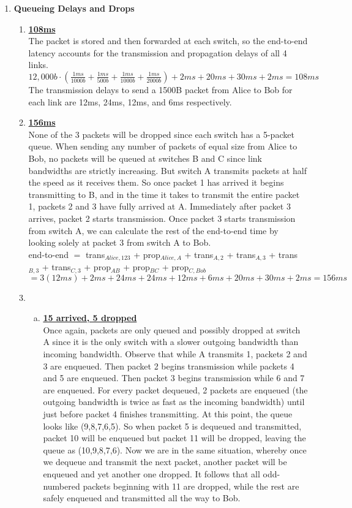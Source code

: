 \documentclass[11pt,fleqn]{article}
\begin{document}
\begin{enumerate}[1)]
\newpage
\item  \textbf{Queueing Delays and Drops}
\begin{enumerate}[1.]
\item {\bf\underline{108ms}} \\ The packet is stored and then forwarded at each switch, so the end-to-end latency accounts for the transmission and propagation delays of all 4 links. \\
$\displaystyle 12,000b \cdot (\frac{1ms}{1000b} + \frac{1ms}{500b} + \frac{1ms}{1000b} + \frac{1ms}{2000b}) + 2ms + 20ms + 30ms + 2ms = 108ms$ \\ The transmission delays to send a 1500B packet from Alice to Bob for each link are 12ms, 24ms, 12ms, and 6ms respectively.
\item {\bf\underline{156ms}} \\ None of the 3 packets will be dropped since each switch has a 5-packet queue. When sending any number of packets of equal size from Alice to Bob, no packets will be queued at switches B and C since link bandwidths are strictly increasing. But switch A transmits packets at half the speed as it receives them. So once packet 1 has arrived it begins transmitting to B, and in the time it takes to transmit the entire packet 1, packets 2 and 3 have fully arrived at A. Immediately after packet 3 arrives, packet 2 starts transmission. Once packet 3 starts transmission from switch A, we can calculate the rest of the end-to-end time by looking solely at packet 3 from switch A to Bob. \\
end-to-end $=$ trans$_{Alice,123}$ + prop$_{Alice,A}$ + trans$_{A,2}$ + trans$_{A,3}$ + trans$_{B,3}$ + trans$_{C,3}$ + prop$_{AB}$ + prop$_{BC}$ + prop$_{C,Bob}$ \\
\qquad $= 3(12ms) + 2ms + 24ms + 24ms + 12ms + 6ms + 20ms + 30ms + 2ms = 156ms$
\item
\begin{enumerate}[(a)]
\item {\bf\underline{15 arrived, 5 dropped}} \\ Once again, packets are only queued and possibly dropped at switch A since it is the only switch with a slower outgoing bandwidth than incoming bandwidth. Observe that while A transmits 1, packets 2 and 3 are enqueued. Then packet 2 begins transmission while packets 4 and 5 are enqueued. Then packet 3 begins transmission while 6 and 7 are enqueued. For every packet dequeued, 2 packets are enqueued (the outgoing bandwidth is twice as fast as the incoming bandwidth) until just before packet 4 finishes transmitting. At this point, the queue looks like (9,8,7,6,5). So when packet 5 is dequeued and transmitted, packet 10 will be enqueued but packet 11 will be dropped, leaving the queue as (10,9,8,7,6). Now we are in the same situation, whereby once we dequeue and transmit the next packet, another packet will be enqueued and yet another one dropped. It follows that all odd-numbered packets beginning with 11 are dropped, while the rest are safely enqueued and transmitted all the way to Bob.

\end{enumerate}
\end{enumerate}
\end{enumerate}
\end{document}
